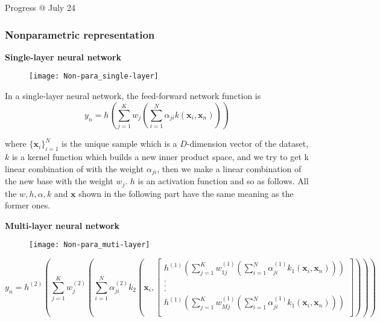 \documentclass{article}
\begin{document}

\newpage
\LARGE Progress @ July 24\normalsize\vspace{3ex}

\subsubsection{Nonparametric representation}

\par \textbf{Single-layer neural network}\\

\begin{figure}[h]
\centering
\texttt{[image: Non-para\_single-layer]}
\end{figure}

\par In a single-layer neural network, the feed-forward network function is 
\begin{equation}
y_n = h \left( \sum\limits_{j=1}^{K} w_{j} \left( \sum\limits_{i=1}^{N} \alpha_{ji} k( \mathbf{x}_{i} , \mathbf{x}_{n}) \right)\right)
\end{equation} 

where $ \{ \mathbf{x}_{i}\}_{i=1}^{N}$ is the unique sample which is a $D$-dimension vector of the dataset, $k$ is a kernel function which builds a new inner product space, and we try to get k linear combination of with the weight $\alpha_{ji}$, then we make a linear combination of the new base with the weight $ w_{j}$. $h$ is an activation function and so as follows.  
All the $w, h, \alpha, k$ and $\mathbf{x}$ shown in the following part have the same meaning as the former ones.\\



\par \textbf{Multi-layer neural network} \\

\begin{figure}[h]
\centering
\texttt{[image: Non-para\_muti-layer]}
\end{figure}

\begin{equation}
y_n = h^{(2)} \left( \sum\limits_{j=1}^{K} w_{j}^{(2)} \left( \sum\limits_{i=1}^{N} \alpha_{ji}^{(2)} k_2( \mathbf{x}_{i},\left[               
  \begin{array}{c}   
    h^{(1)} \left( \sum\limits_{j=1}^{K} w_{1j}^{(1)} \left( \sum\limits_{i=1}^{N} \alpha_{ji}^{(1)}k_1( \mathbf{x}_{i},\mathbf{x}_n) \right) \right)\\  
    .\\  
    .\\  
    .\\
    h^{(1)} \left( \sum\limits_{j=1}^{K} w_{Mj}^{(1)} \left( \sum\limits_{i=1}^{N} \alpha_{ji}^{(1)}k_1( \mathbf{x}_{i},\mathbf{x}_n) \right) \right)\\
  \end{array}
\right] )
 \right) \right)
\end{equation} 
\end{document}
